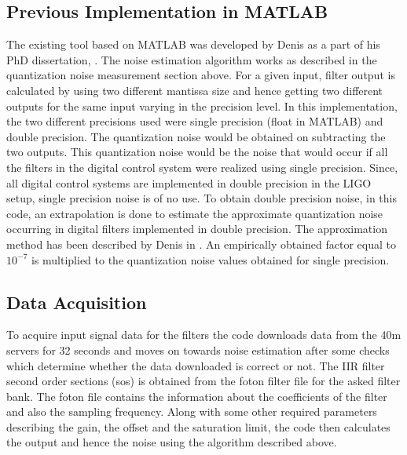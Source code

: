 \documentclass[colorlinks=true,pdfstartview=FitV,linkcolor=blue,
            citecolor=red,urlcolor=magenta]{ligodoc}
\begin{document}
	\subsection{Previous Implementation in MATLAB}
	The existing tool based on MATLAB was developed by Denis as a part of his PhD dissertation, \cite{thesis}. The noise estimation algorithm works as described in the quantization noise measurement section above. For a given input, filter output is calculated by using two different mantissa size and hence getting two different outputs for the same input varying in the precision level. In this implementation, the two different precisions used were single precision (float in MATLAB) and double precision. The quantization noise would be obtained on subtracting the two outputs. This quantization noise would be the noise that would occur if all the filters in the digital control system were realized using single precision. Since, all digital control systems are implemented in double precision in the LIGO setup, single precision noise is of no use. To obtain double precision noise, in this code, an extrapolation is done to estimate the approximate quantization noise occurring in digital filters implemented in double precision. The approximation method has been described by Denis in \cite{denapprox}. An empirically obtained factor equal to $10^{-7}$ is multiplied to the quantization noise values obtained for single precision. 
		\subsection{Data Acquisition} To acquire input signal data for the filters the code downloads data from the 40m servers for 32 seconds and moves on towards noise estimation after some checks which determine whether the data downloaded is correct or not. The IIR filter second order sections (sos) is obtained from the foton filter file for the asked filter bank. The foton file contains the information about the coefficients of the filter and also the sampling frequency. Along with some other required parameters describing the gain, the offset and the saturation limit, the code then calculates the output and hence the noise using the algorithm described above.
\end{document}

